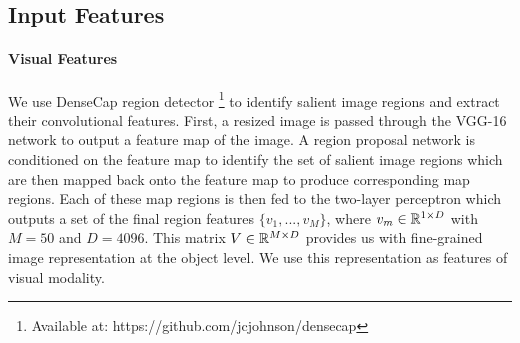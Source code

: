 \documentclass[11pt,a4paper]{article}
\newcommand{\kibitz}[2]{\ifnum\Comments=1\textcolor{#1}{#2}\fi}
\newcommand{\nikolai}[1]{\kibitz{red}   {[Nikolai: #1]}}
\newcommand{\R}{\mathbb{R}}
\begin{document}




\subsection{Input Features}

\paragraph{Visual Features}
We use DenseCap region detector \cite{densecap}\footnote{Available at: https://github.com/jcjohnson/densecap} to identify salient image regions and extract their convolutional features.
First, a resized image is passed through the VGG-16 network \cite{Simonyan2014} to output a feature map of the image.
A region proposal network is conditioned on the feature map to identify the set of salient image regions which are then mapped back onto the feature map to produce corresponding map regions.
Each of these map regions is then fed to the two-layer perceptron which outputs a set of the final region features ${\{v_1, ..., v_M\}}$, where $v_m \in \R\sp{1 \times D}$ with $M=50$ and $D=4096$.
This matrix $V \in \R\sp{M \times D}$ provides us with fine-grained image representation at the object level.
We use this representation as features of visual modality.
\end{document}
